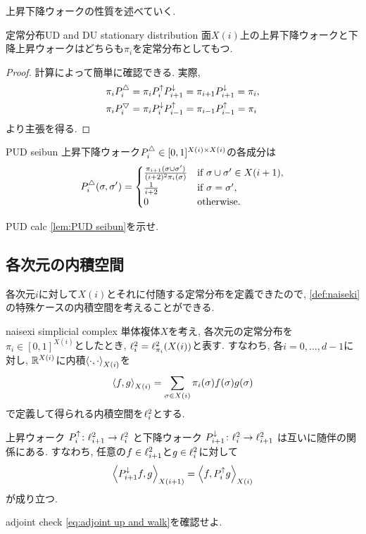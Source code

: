 上昇下降ウォークの性質を述べていく.
\begin{lemma}{定常分布}{UD and DU stationary distribution}
    面$X(i)$上の上昇下降ウォークと下降上昇ウォークはどちらも$\pi_i$を定常分布としてもつ.
\end{lemma}
\begin{proof}
    計算によって簡単に確認できる.
    実際,
    \begin{align*}
        &\pi_i \PUD_i = \pi_i \Pup_i \Pdown_{i+1} = \pi_{i+1} \Pdown_{i+1} = \pi_i, \\
        &\pi_i \PDU_i = \pi_i \Pdown_i \Pup_{i-1} = \pi_{i-1}\Pup_{i-1} = \pi_i
    \end{align*}
    より主張を得る.
\end{proof}
\begin{lemma}{}{PUD seibun}
    上昇下降ウォーク$\PUD_i \in [0,1]^{X(i)\times X(i)}$の各成分は
        \[
            \PUD_i(\sigma,\sigma') = \begin{cases}
                \frac{\pi_{i+1}(\sigma\cup\sigma')}{(i+2)^2\pi_i(\sigma)}
                & \tif \sigma\cup\sigma'\in X(i+1),\\
                \frac{1}{i+2} & \tif \sigma=\sigma', \\
                0 & \totherwise.
            \end{cases}
        \]
\end{lemma}
\begin{exercise}{}{PUD calc}
    \cref{lem:PUD seibun}を示せ.
\end{exercise}


\subsection{各次元の内積空間} \label{sec:inaiseki}
各次元$i$に対して$X(i)$とそれに付随する定常分布を定義できたので, \cref{def:naiseki}の特殊ケースの内積空間を考えることができる.
\begin{definition}{}{naisexi simplicial complex}
    単体複体$X$を考え, 各次元の定常分布を$\pi_i \in [0,1]^{X(i)}$としたとき, $\ispace = \ell^2_{\pi_i}(X(i))$と表す.
    すなわち, 各$i=0,\dots,d-1$に対し, $\Real^{X(i)}$に内積$\iprod{\cdot,\cdot}$を
    \[
        \iprod{f,g} = \sum_{\sigma \in X(i)} \pi_i(\sigma) f(\sigma)g(\sigma)
    \]
    で定義して得られる内積空間を$\ispace$とする.
\end{definition}
%
上昇ウォーク
$\Pup_i\colon \ispace[i+1] \to \ispace$
と下降ウォーク
$\Pdown_{i+1} \colon \ispace \to \ispace[i+1]$
は互いに随伴の関係にある.
すなわち, 任意の$f\in \ispace[i+1]$と$g\in \ispace$に対して
\begin{align}
    \iprod[i+1]{\Pdown_{i+1} f,g} =
    \iprod{f,\Pup_{i}g}
    \label{eq:adjoint up and walk}
\end{align}
が成り立つ.
%
\begin{exercise}{}{adjoint check}
\cref{eq:adjoint up and walk}を確認せよ.
\end{exercise}

